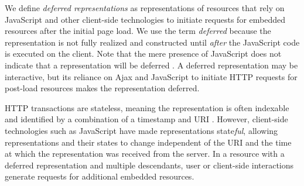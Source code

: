 \documentclass{sig-alternate}
\begin{document}
We define \emph{deferred representations} as representations of resources that rely on JavaScript and other client-side technologies to initiate requests for embedded resources after the initial page load. We use the term \emph{deferred} because the representation is not fully realized and constructed until \emph{after} the JavaScript code is executed on the client. 
Note that the mere presence of JavaScript does not indicate that a representation will be deferred%
. A deferred representation may be interactive, but its reliance on Ajax and JavaScript to initiate HTTP requests for post-load resources makes the representation deferred.

HTTP transactions are stateless, meaning the representation is often indexable and identified by a combination of a timestamp and URI \cite{Fielding:2002:PDM:514183.514185}. However, 
client-side technologies such as JavaScript have made representations state\emph{ful}, allowing representations and their states to change independent of the URI and the time at which the representation was received from the server. In a resource with a deferred representation and multiple descendants, user or client-side interactions generate requests for additional embedded resources.


\end{document}
